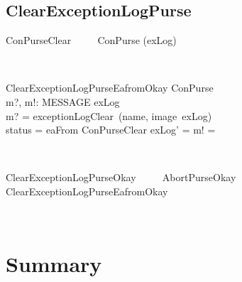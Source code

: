 \subsection{ClearExceptionLogPurse}

\begin{LSDef}
\begin{zed}
   ConPurseClear ~~~~ ConPurse \hide (exLog)
\end{zed}~\end{LSDef}

\begin{LSDef}
\begin{schema}{ClearExceptionLogPurseEafromOkay}
   \Delta ConPurse \\
   m?, m!: MESSAGE
\where
   exLog \neq \emptyset \\
   m? = exceptionLogClear~(name, image~exLog) \\
   status = eaFrom
   \also
   \Xi ConPurseClear
   \also
   exLog' = \emptyset
   \also
   m! = \bot
\end{schema}~\end{LSDef}

\begin{LSDef}
\begin{zed}
   ClearExceptionLogPurseOkay ~~~~ AbortPurseOkay \semi ClearExceptionLogPurseEafromOkay
\end{zed}~\end{LSDef}

\newpage

\section{Summary}\label{ch4.summary}

\ldefsummary %
\lthmsummary %
\lthmaddeddefsummary %
\lthmaddedthmsummary %
\lzevessummary %
